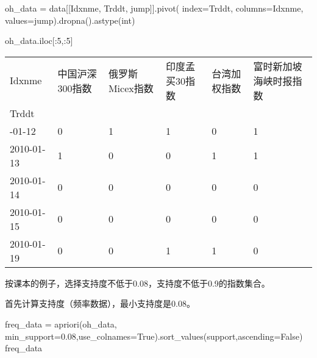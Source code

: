 \documentclass[
  letterpaper,
  DIV=11,
  numbers=noendperiod]{scrreprt}
\newenvironment{Shaded}{\begin{snugshade}}{\end{snugshade}}
\newcommand{\BuiltInTok}[1]{\textcolor[rgb]{0.00,0.23,0.31}{#1}}
\newcommand{\DecValTok}[1]{\textcolor[rgb]{0.68,0.00,0.00}{#1}}
\newcommand{\FloatTok}[1]{\textcolor[rgb]{0.68,0.00,0.00}{#1}}
\newcommand{\NormalTok}[1]{\textcolor[rgb]{0.00,0.23,0.31}{#1}}
\newcommand{\OperatorTok}[1]{\textcolor[rgb]{0.37,0.37,0.37}{#1}}
\newcommand{\StringTok}[1]{\textcolor[rgb]{0.13,0.47,0.30}{#1}}
\newcommand{\VariableTok}[1]{\textcolor[rgb]{0.07,0.07,0.07}{#1}}
\begin{document}
\begin{Shaded}
\begin{Highlighting}[]
\NormalTok{oh\_data }\OperatorTok{=}\NormalTok{ data[[}\StringTok{\textquotesingle{}Idxnme\textquotesingle{}}\NormalTok{, }\StringTok{\textquotesingle{}Trddt\textquotesingle{}}\NormalTok{, }\StringTok{\textquotesingle{}jump\textquotesingle{}}\NormalTok{]].pivot(}
\NormalTok{    index}\OperatorTok{=}\StringTok{\textquotesingle{}Trddt\textquotesingle{}}\NormalTok{, columns}\OperatorTok{=}\StringTok{\textquotesingle{}Idxnme\textquotesingle{}}\NormalTok{, values}\OperatorTok{=}\StringTok{\textquotesingle{}jump\textquotesingle{}}\NormalTok{).dropna().astype(}\BuiltInTok{int}\NormalTok{)}

\NormalTok{oh\_data.iloc[:}\DecValTok{5}\NormalTok{,:}\DecValTok{5}\NormalTok{]}
\end{Highlighting}
\end{Shaded}

\begin{longtable}[]{@{}llllll@{}}
\toprule\noalign{}
Idxnme & 中国沪深300指数 & 俄罗斯Micex指数 & 印度孟买30指数 &
台湾加权指数 & 富时新加坡海峡时报指数 \\
Trddt & & & & & \\
\midrule\noalign{}
\endhead
\bottomrule\noalign{}
\endlastfoot
2010-01-12 & 0 & 1 & 1 & 0 & 1 \\
2010-01-13 & 1 & 0 & 0 & 1 & 1 \\
2010-01-14 & 0 & 0 & 0 & 0 & 0 \\
2010-01-15 & 0 & 0 & 0 & 0 & 0 \\
2010-01-19 & 0 & 0 & 1 & 1 & 0 \\
\end{longtable}

按课本的例子，选择支持度不低于0.08，支持度不低于0.9的指数集合。

首先计算支持度（频率数据），最小支持度是0.08。

\begin{Shaded}
\begin{Highlighting}[]
\NormalTok{freq\_data }\OperatorTok{=}\NormalTok{ apriori(oh\_data, min\_support}\OperatorTok{=}\FloatTok{0.08}\NormalTok{,use\_colnames}\OperatorTok{=}\VariableTok{True}\NormalTok{).sort\_values(}\StringTok{\textquotesingle{}support\textquotesingle{}}\NormalTok{,ascending}\OperatorTok{=}\VariableTok{False}\NormalTok{)}
\NormalTok{freq\_data}
\end{Highlighting}
\end{Shaded}
\end{document}
